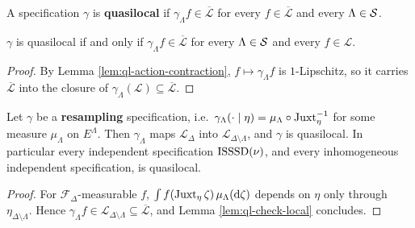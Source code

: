 \begin{definition}
    \label{def:ql-quasilocal-spec}
    \leanok

    A specification $\gamma$ is \textbf{quasilocal} if $\gamma_\Lambda f \in
    \overline{\mathcal{L}}$ for every $f \in \overline{\mathcal{L}}$ and every $\Lambda \in \mathcal{S}$.
\end{definition}

\begin{lemma}
    \label{lem:ql-check-local}
    \leanok

    $\gamma$ is quasilocal if and only if $\gamma_\Lambda f \in \overline{\mathcal{L}}$ for every
    $\Lambda \in \mathcal{S}$ and every $f \in \mathcal{L}$.
\end{lemma}
\begin{proof}
    \leanok

    By Lemma \ref{lem:ql-action-contraction}, $f \mapsto \gamma_\Lambda f$ is $1$-Lipschitz, so it
    carries $\overline{\mathcal{L}}$ into the closure of
    $\gamma_\Lambda(\mathcal{L}) \subseteq \overline{\mathcal{L}}$.
\end{proof}

\begin{proposition}
    \label{prop:ql-isssd}
    \leanok

    Let $\gamma$ be a \textbf{resampling} specification, i.e.\
    $\gamma_\Lambda(\cdot \mid \eta) = \mu_\Lambda \circ \operatorname{Juxt}_{\eta}^{-1}$ for some measure
    $\mu_\Lambda$ on $E^\Lambda$. Then $\gamma_\Lambda$ maps $\mathcal{L}_\Delta$ into
    $\mathcal{L}_{\Delta \setminus \Lambda}$, and $\gamma$ is quasilocal. In particular every
    independent specification $\operatorname{ISSSD}(\nu)$, and every inhomogeneous independent specification, is
    quasilocal.
\end{proposition}
\begin{proof}
    \leanok

    For $\mathcal{F}_\Delta$-measurable $f$,
    $\int f(\operatorname{Juxt}_{\eta}\zeta)\, \mu_\Lambda(\mathrm{d}\zeta)$ depends on $\eta$ only through
    $\eta_{\Delta \setminus \Lambda}$. Hence $\gamma_\Lambda f \in
    \mathcal{L}_{\Delta\setminus\Lambda} \subseteq \overline{\mathcal{L}}$, and
    Lemma \ref{lem:ql-check-local} concludes.
\end{proof}

